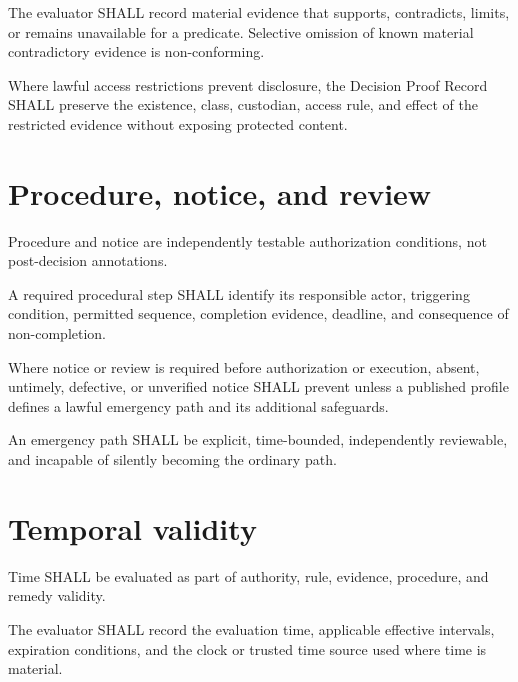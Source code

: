 \begin{requirement}[ACA-120-019]
The evaluator SHALL record material evidence that supports, contradicts, limits,
or remains unavailable for a predicate. Selective omission of known material
contradictory evidence is non-conforming.
\end{requirement}

\begin{requirement}[ACA-120-020]
Where lawful access restrictions prevent disclosure, the Decision Proof Record
SHALL preserve the existence, class, custodian, access rule, and effect of the
restricted evidence without exposing protected content.
\end{requirement}

\section{Procedure, notice, and review}
Procedure and notice are independently testable authorization conditions, not
post-decision annotations.

\begin{requirement}[ACA-120-021]
A required procedural step SHALL identify its responsible actor, triggering
condition, permitted sequence, completion evidence, deadline, and consequence
of non-completion.
\end{requirement}

\begin{requirement}[ACA-120-022]
Where notice or review is required before authorization or execution, absent,
untimely, defective, or unverified notice SHALL prevent  unless a
published profile defines a lawful emergency path and its additional safeguards.
\end{requirement}

\begin{requirement}[ACA-120-023]
An emergency path SHALL be explicit, time-bounded, independently reviewable, and
incapable of silently becoming the ordinary path.
\end{requirement}

\section{Temporal validity}
Time SHALL be evaluated as part of authority, rule, evidence, procedure, and
remedy validity.

\begin{requirement}[ACA-120-024]
The evaluator SHALL record the evaluation time, applicable effective intervals,
expiration conditions, and the clock or trusted time source used where time is
material.
\end{requirement}

